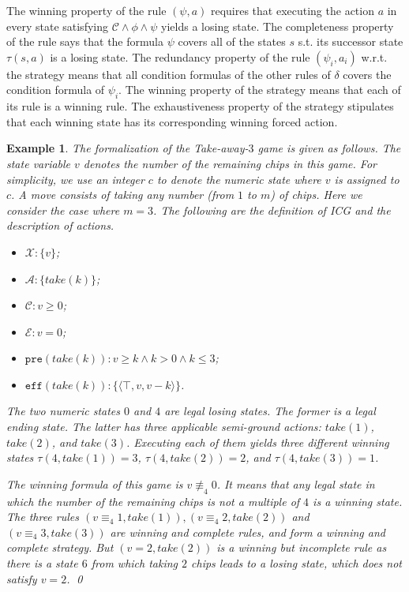 \documentclass[review]{elsarticle}
\newcommand{\set}[1]{\{ #1 \}}
\newcommand{\tuple}[1]{\langle {#1} \rangle}
\newcommand{\true}{\top}
\newcommand{\statevar}{\mathcal{X}}
\newcommand{\act}{\mathcal{A}}
\newcommand{\constraint}{\mathcal{C}}
\newcommand{\estate}{\mathcal{E}}
\newcommand{\pre}{\mathtt{pre}}
\newcommand{\eff}{\mathtt{eff}}
\newcommand{\suc}{\tau}
\newcommand{\modulo}{\equiv}
\newcommand{\nmodulo}{\not \equiv}
\newtheorem{example}{Example}
\begin{document}
	The winning property of the rule $(\psi, a)$ requires that executing the action $a$ in every state satisfying $\constraint \land \phi \land \psi$ yields a losing state.
	The completeness property of the rule says that the formula $\psi$ covers all of the states $s$ s.t. its successor state $\suc(s, a)$ is a losing state.	
	The redundancy property of the rule $(\psi_i, a_i)$ w.r.t. the strategy means that all condition formulas of the other rules of $\delta$ covers the condition formula of $\psi_i$.
	The winning property of the strategy means that each of its rule is a winning rule.
	The exhaustiveness property of the strategy stipulates that each winning state has its corresponding winning forced action.
	
	\begin{example} \label{exm:take-away} \rm 	
		The formalization of the Take-away-$3$ game \cite{Gol1966} is given as follows.
		The state variable $v$ denotes the number of the remaining chips in this game. For simplicity, we use an integer $c$ to denote the numeric state where $v$ is assigned to $c$.
		A move consists of taking any number (from $1$ to $m$) of chips.
		Here we consider the case where $m = 3$. 
        The following are the definition of ICG and the description of actions.
		\begin{itemize}		    
            \item $\statevar: \set{v}$;
            \item $\act:\set{take(k)}$;
        	\item $\constraint: v \ge 0$;
        	\item $\estate: v = 0$;
			\item $\pre(take(k)): v \geq k \land k > 0 \land k \leq 3$;
			\item $\eff(take(k)): \set{\tuple{\true, v, v - k}}$.
		\end{itemize}		
        
		The two numeric states $0$ and $4$ are legal losing states.		
		The former is a legal ending state.
		The latter has three applicable semi-ground actions: $take(1)$, $take(2)$, and $take(3)$. 
		Executing each of them yields three different winning states $\tau(4, take(1)) = 3$, $\tau(4, take(2)) = 2$, and $\tau(4, take(3)) = 1$.
		
		The winning formula of this game is $v \nmodulo_4 0$.
		It means that any legal state in which the number of the remaining chips is not a multiple of $4$ is a winning state.
		The three rules $(v \modulo_4 1, take(1)), (v \modulo_4 2, take(2))$ and $(v \modulo_4 3, take(3))$ are winning and complete rules, and form a winning and complete strategy.
		But $(v = 2, take(2))$ is a winning but incomplete rule as there is a state $6$ from which taking $2$ chips leads to a losing state, which does not satisfy $v = 2$.
		\qed
	\end{example}
	
\end{document}
